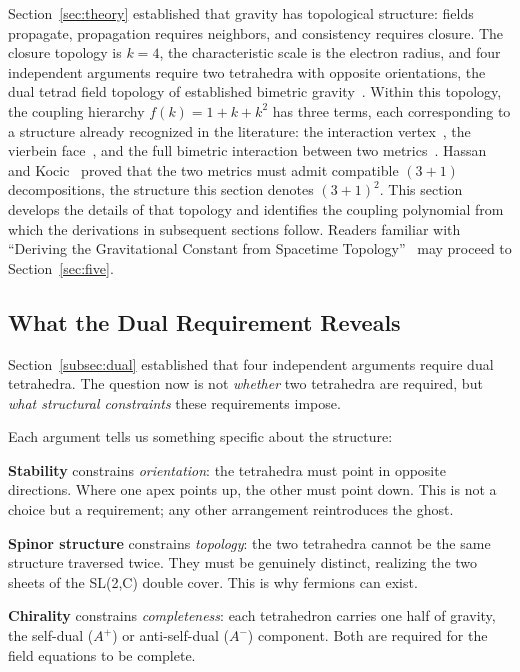 \documentclass[aps,prd,preprint,superscriptaddress,showpacs,preprintnumbers,amsmath,amssymb,nofootinbib]{revtex4-2}
\begin{document}
Section~\ref{sec:theory} established that gravity has topological structure: fields propagate, propagation requires neighbors, and consistency requires closure. The closure topology is $k = 4$, the characteristic scale is the electron radius, and four independent arguments require two tetrahedra with opposite orientations, the dual tetrad field topology of established bimetric gravity~\cite{hassan2012}. Within this topology, the coupling hierarchy $f(k) = 1 + k + k^2$ has three terms, each corresponding to a structure already recognized in the literature: the interaction vertex~\cite{hinterbichler2012}, the vierbein face~\cite{mtw1973}, and the full bimetric interaction between two metrics~\cite{hassan2012}. Hassan and Kocic~\cite{hassankocic2018} proved that the two metrics must admit compatible $(3{+}1)$ decompositions, the structure this section denotes $(3{+}1)^2$. This section develops the details of that topology and identifies the coupling polynomial from which the derivations in subsequent sections follow. Readers familiar with ``Deriving the Gravitational Constant from Spacetime Topology''~\cite{paper6} may proceed to Section~\ref{sec:five}.

\subsection{What the Dual Requirement Reveals}
\label{subsec:two-tet}

Section~\ref{subsec:dual} established that four independent arguments require dual tetrahedra. The question now is not \emph{whether} two tetrahedra are required, but \emph{what structural constraints} these requirements impose.

Each argument tells us something specific about the structure:

\textbf{Stability} constrains \emph{orientation}: the tetrahedra must point in opposite directions. Where one apex points up, the other must point down. This is not a choice but a requirement; any other arrangement reintroduces the ghost.

\textbf{Spinor structure} constrains \emph{topology}: the two tetrahedra cannot be the same structure traversed twice. They must be genuinely distinct, realizing the two sheets of the SL(2,C) double cover. This is why fermions can exist.

\textbf{Chirality} constrains \emph{completeness}: each tetrahedron carries one half of gravity, the self-dual ($A^+$) or anti-self-dual ($A^-$) component. Both are required for the field equations to be complete.
\end{document}
